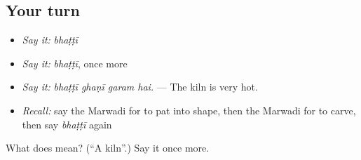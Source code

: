 \subsection*{Your turn}
\begin{itemize}
\raggedright
  \item \emph{Say it:} \emph{bhaṭṭī}
  \item \emph{Say it:} \emph{bhaṭṭī}, once more
  \item \emph{Say it:} \emph{bhaṭṭī ghaṇī garam hai.} — The kiln is very hot.
  \item \emph{Recall:} say the Marwadi for to pat into shape, then the Marwadi for to carve, then say \emph{bhaṭṭī} again
\end{itemize}

\begin{tcolorbox}[breakable,colback=teal!4,colframe=teal!35!black,title={Before you move on}]
What does  mean? (\textquotedblleft{}A kiln\textquotedblright{}.) Say it once more.
\end{tcolorbox}
